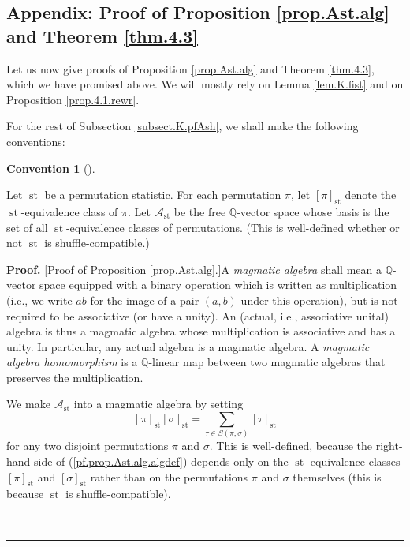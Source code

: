 \documentclass[numbers=enddot,12pt,final,onecolumn,notitlepage]{scrartcl}%
\theoremstyle{definition}
\newtheorem{conv}[theo]{Convention}
\newenvironment{convention}[1][]
{\begin{conv}[#1]\begin{leftbar}}
{\end{leftbar}\end{conv}}
\newenvironment{proof}[1][Proof]{\noindent\textbf{#1.} }{\ \rule{0.5em}{0.5em}}
\newenvironment{convention}[1][Convention]{\noindent\textbf{#1.} }{\ \rule{0.5em}{0.5em}}
\newenvironment{verlong}{}{}
\let\sumnonlimits\sum
\renewcommand{\sum}{\sumnonlimits\limits}
\begin{document}
\begin{verlong}
\subsection{\label{subsect.K.pfAsh}Appendix: Proof of Proposition
\ref{prop.Ast.alg} and Theorem \ref{thm.4.3}}

Let us now give proofs of Proposition \ref{prop.Ast.alg} and Theorem
\ref{thm.4.3}, which we have promised above. We will mostly rely on Lemma
\ref{lem.K.fist} and on Proposition \ref{prop.4.1.rewr}.

For the rest of Subsection \ref{subsect.K.pfAsh}, we shall make the following conventions:

\begin{convention}
Let $\operatorname*{st}$ be a permutation statistic. For each permutation
$\pi$, let $\left[  \pi\right]  _{\operatorname*{st}}$ denote the
$\operatorname*{st}$-equivalence class of $\pi$. Let $\mathcal{A}%
_{\operatorname*{st}}$ be the free $\mathbb{Q}$-vector space whose basis is
the set of all $\operatorname*{st}$-equivalence classes of permutations. (This
is well-defined whether or not $\operatorname*{st}$ is shuffle-compatible.)
\end{convention}

\begin{proof}
[Proof of Proposition \ref{prop.Ast.alg}.]A \textit{magmatic algebra} shall
mean a $\mathbb{Q}$-vector space equipped with a binary operation which is
written as multiplication (i.e., we write $ab$ for the image of a pair
$\left(  a,b\right)  $ under this operation), but is not required to be
associative (or have a unity). An (actual, i.e., associative unital) algebra
is thus a magmatic algebra whose multiplication is associative and has a
unity. In particular, any actual algebra is a magmatic algebra. A
\textit{magmatic algebra homomorphism} is a $\mathbb{Q}$-linear map between
two magmatic algebras that preserves the multiplication.

We make $\mathcal{A}_{\operatorname*{st}}$ into a magmatic algebra by setting%
\begin{equation}
\left[  \pi\right]  _{\operatorname*{st}}\left[  \sigma\right]
_{\operatorname*{st}}=\sum_{\tau\in S\left(  \pi,\sigma\right)  }\left[
\tau\right]  _{\operatorname*{st}} \label{pf.prop.Ast.alg.algdef}%
\end{equation}
for any two disjoint permutations $\pi$ and $\sigma$. This is well-defined,
because the right-hand side of (\ref{pf.prop.Ast.alg.algdef}) depends only on
the $\operatorname*{st}$-equivalence classes $\left[  \pi\right]
_{\operatorname*{st}}$ and $\left[  \sigma\right]  _{\operatorname*{st}}$
rather than on the permutations $\pi$ and $\sigma$ themselves (this is because
$\operatorname*{st}$ is shuffle-compatible).


\end{proof}
\end{verlong}
\end{document}
